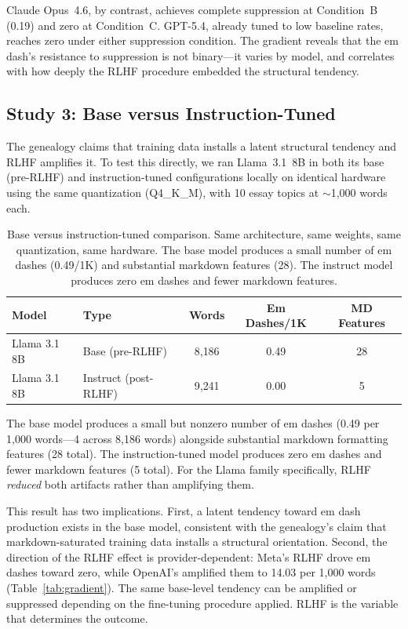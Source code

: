 Claude Opus~4.6, by contrast, achieves complete suppression at Condition~B (0.19) and zero at Condition~C. GPT-5.4, already tuned to low baseline rates, reaches zero under either suppression condition. The gradient reveals that the em dash's resistance to suppression is not binary---it varies by model, and correlates with how deeply the RLHF procedure embedded the structural tendency.

\subsection{Study 3: Base versus Instruction-Tuned}

The genealogy claims that training data installs a latent structural tendency and RLHF amplifies it. To test this directly, we ran Llama~3.1~8B in both its base (pre-RLHF) and instruction-tuned configurations locally on identical hardware using the same quantization (Q4\_K\_M), with 10 essay topics at $\sim$1,000 words each.

\begin{table}[ht]
\centering
\small
\begin{tabular}{llccc}
\toprule
\textbf{Model} & \textbf{Type} & \textbf{Words} & \textbf{Em Dashes/1K} & \textbf{MD Features} \\
\midrule
Llama 3.1 8B & Base (pre-RLHF) & 8{,}186 & 0.49 & 28 \\
Llama 3.1 8B & Instruct (post-RLHF) & 9{,}241 & 0.00 & 5 \\
\bottomrule
\end{tabular}
\caption{Base versus instruction-tuned comparison. Same architecture, same weights, same quantization, same hardware. The base model produces a small number of em dashes (0.49/1K) and substantial markdown features (28). The instruct model produces zero em dashes and fewer markdown features.}
\label{tab:base}
\end{table}

The base model produces a small but nonzero number of em dashes (0.49 per 1,000 words---4 across 8,186 words) alongside substantial markdown formatting features (28 total). The instruction-tuned model produces zero em dashes and fewer markdown features (5 total). For the Llama family specifically, RLHF \textit{reduced} both artifacts rather than amplifying them.

This result has two implications. First, a latent tendency toward em dash production exists in the base model, consistent with the genealogy's claim that markdown-saturated training data installs a structural orientation. Second, the direction of the RLHF effect is provider-dependent: Meta's RLHF drove em dashes toward zero, while OpenAI's amplified them to 14.03 per 1,000 words (Table~\ref{tab:gradient}). The same base-level tendency can be amplified or suppressed depending on the fine-tuning procedure applied. RLHF is the variable that determines the outcome.

